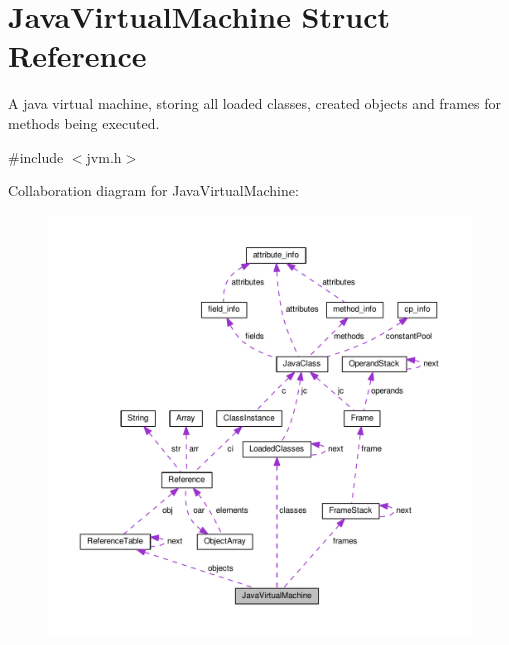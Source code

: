 \hypertarget{structJavaVirtualMachine}{}\section{Java\+Virtual\+Machine Struct Reference}
\label{structJavaVirtualMachine}


A java virtual machine, storing all loaded classes, created objects and frames for methods being executed.  




{\ttfamily \#include $<$jvm.\+h$>$}



Collaboration diagram for Java\+Virtual\+Machine\+:\nopagebreak
\begin{figure}[H]
\begin{center}
\leavevmode
\includegraphics[width=350pt]{structJavaVirtualMachine__coll__graph}
\end{center}
\end{figure}
